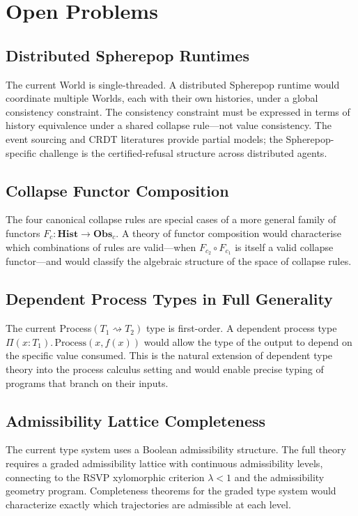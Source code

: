 \documentclass[12pt, a4paper, openany]{book}
\theoremstyle{plain}
\theoremstyle{definition}
\theoremstyle{remark}
\newcommand{\Hist}{\mathbf{Hist}}
\newcommand{\Obs}{\mathbf{Obs}}
\begin{document}
\section{Open Problems}

\subsection{Distributed Spherepop Runtimes}

The current World is single-threaded. A distributed Spherepop runtime would
coordinate multiple Worlds, each with their own histories, under a global
consistency constraint. The consistency constraint must be expressed in terms of
history equivalence under a shared collapse rule---not value consistency. The
event sourcing and CRDT literatures provide partial models; the Spherepop-specific
challenge is the certified-refusal structure across distributed agents.

\subsection{Collapse Functor Composition}

The four canonical collapse rules are special cases of a more general family of
functors $F_c : \Hist \to \Obs_c$. A theory of functor composition would
characterise which combinations of rules are valid---when $F_{c_2} \circ F_{c_1}$
is itself a valid collapse functor---and would classify the algebraic structure
of the space of collapse rules.

\subsection{Dependent Process Types in Full Generality}

The current Process$(T_1 \rightsquigarrow T_2)$ type is first-order. A dependent
process type $\Pi(x : T_1).\, \mathrm{Process}(x, f(x))$ would allow the type
of the output to depend on the specific value consumed. This is the natural
extension of dependent type theory into the process calculus setting and would
enable precise typing of programs that branch on their inputs.

\subsection{Admissibility Lattice Completeness}

The current type system uses a Boolean admissibility structure. The full theory
requires a graded admissibility lattice with continuous admissibility levels,
connecting to the RSVP xylomorphic criterion $\lambda < 1$ and the admissibility
geometry program. Completeness theorems for the graded type system would
characterize exactly which trajectories are admissible at each level.
\end{document}
